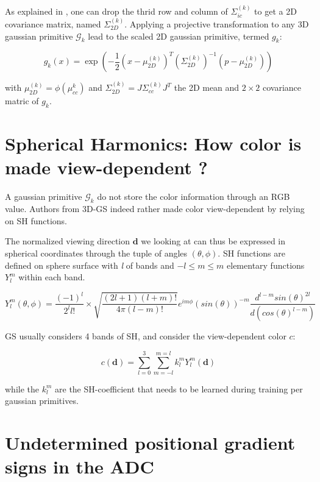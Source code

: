 As explained in \citep{zwicker2001ewa}, one can drop the thrid row and column of  $\Sigma^{(k)}_{ic}$ to get a 2D covariance matrix, named $\Sigma^{(k)}_{2D}$. Applying a projective transformation to any 3D gaussian primitive $\mathcal{G}_{k}$ lead to the scaled 2D gaussian primitive, termed $g_{k}$: 

\begin{equation}
    g_{k}(x) = \exp(-\frac{1}{2}(x-\mu^{(k)}_{2D})^{T}(\Sigma^{(k)}_{2D})^{-1}(p-\mu^{(k)}_{2D}))
\end{equation}

with $\mu^{(k)}_{2D}= \phi(\mu_{cc}^{k})$ and $\Sigma^{(k)}_{2D}= J\Sigma^{(k)}_{cc}J^{T}$ the 2D mean and $2\times2$ covariance matric of $ g_{k}$. 


\section{Spherical Harmonics: How color is made view-dependent ?}
\label{appendix:gs-sh}

A gaussian primitive $\mathcal{G}_{k}$ do not store the color information through an RGB value. Authors from 3D-\ac{GS} indeed rather made color view-dependent by relying on \ac{SH} functions. 

The normalized viewing direction $\mathbf{d}$ we looking at can thus be expressed in spherical coordinates through the tuple of angles $(\theta,\phi)$. \ac{SH} functions are defined on sphere surface with \textit{l} of bands and $-l \leq  m \leq m$ elementary functions $Y_{l}^{m}$ within each band.

\begin{equation}
    Y_{l}^{m}(\theta,\phi) = \frac{(-1)^{l}}{2^{l}l!} \times \sqrt{\frac{(2l+1)(l+m)!}{4\pi(l-m)!}}e^{im\phi}(sin(\theta))^{-m}\frac{d^{l-m}sin(\theta)^{2l}}{d(cos(\theta)^{l-m})}
\end{equation}

\ac{GS} usually considers 4 bands of \ac{SH}, and consider the view-dependent color $c$: 

\begin{equation}
    c(\mathbf{d}) = \sum_{l=0}^{3}\sum_{m=-l}^{m=l}k_{l}^{m}Y_{l}^{m}(\mathbf{d})
\end{equation}

while the $k_{l}^{m}$ are the \ac{SH}-coefficient that needs to be learned during training per gaussian primitives. 

\section{Undetermined positional gradient signs in the ADC}
\label{appendix:sign-gradient}

